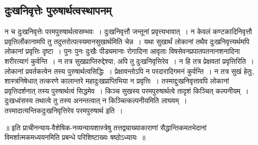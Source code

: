 		\subsection{दुःखनिवृत्तेः पुरुषार्थत्वस्थापनम्}

		न च दुःखनिवृत्तेः परमपुरुषार्थत्वसम्भवः~। दुःखनिवृत्तौ  जन्तूनां प्रवृत्त्यभावात्~। न केवलं कण्टकादिनिवृत्तौ प्रवृत्तिर्लोकानामपि तु तदुत्तरोत्पत्स्यमानसुखार्थमिति चेन्न~। यथा सुखार्थं लोकानां तथैव दुःखनिवृत्त्यर्थमपि लोकानां प्रवृत्तिः दृष्टा~। पुनः पुनः दुःखैः पीड्यमानाः रोगादिना आवृताः विषसेवनप्रपातपतनानशनादिना शरीरत्यागं कुर्वन्ति~। न तत्र सुखप्राप्तिरुद्देश्या, अपि तु दुःखनिवृत्तिरेव~। न हि तत्र प्रेक्षवतां प्रवृत्तिरिति~। लोकानां प्रवर्तकत्वेन तस्य पुरुषार्थत्वसिद्धिः~। प्रेक्षावन्तोऽपि न परदारादिगमनं कुर्वन्ति~। न तत्र सुखं हेतुः, शास्त्रनिषेधात् तत्करणे कालान्तरे महादुःखप्राप्तिभिया न प्रवृत्तिः~। तस्माद्दुःखनिवृत्तावपि लोकानां प्रवृत्तिदर्शनात् तस्य पुरुषार्थत्वं सिद्धमेव~। किञ्च सुखस्य परमपुरुषार्थत्वे तादृशं किञ्चित् कल्पनीयम्~। दुःखध्वंसस्य तथात्वे तु तस्य अनन्तत्वात् न किञ्चित्कल्पनीयमिति लाघवम्~। तस्मादात्यन्तिकदुःखनिवृत्तिरेव परमपुरुषार्थ इति~।

\begin{center}\begin{small}॥ इति प्राचीनन्याय-वैशेषिक-नव्यन्यायशास्त्रेषु तत्तद्व्याख्याकाराणां सैद्धान्तिकमतभेदानां विमर्शात्मकमध्ययनमिति प्रबन्धे  परिशिष्टाख्यः षष्ठोऽध्यायः~॥\end{small}\end{center}
